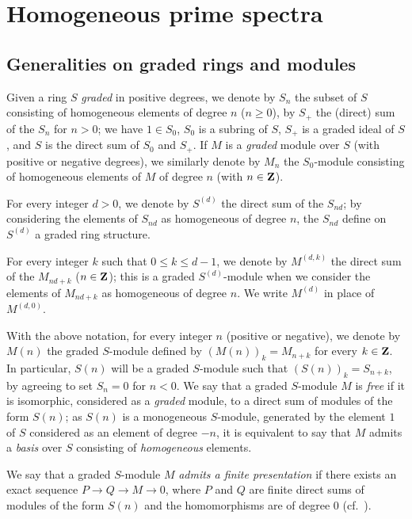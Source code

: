 \section{Homogeneous prime spectra}
\label{section:II.2}

\subsection{Generalities on graded rings and modules}
\label{subsection:II.2.1}

\begin{notation}[2.1.1]
\label{II.2.1.1}
Given a ring $S$ \emph{graded} in positive degrees, we denote by $S_n$ the subset of $S$ consisting of homogeneous elements of degree $n$ ($n\geq 0$), by $S_+$ the (direct) sum of the $S_n$ for $n>0$;
we have $1\in S_0$, $S_0$ is a subring of $S$, $S_+$ is a graded ideal of $S$, and $S$ is the direct sum of $S_0$ and $S_+$.
If $M$ is a \emph{graded} module over $S$ (with positive or negative degrees), we similarly denote by $M_n$ the $S_0$-module consisting of homogeneous elements of $M$ of degree $n$ (with $n\in\mathbf{Z}$).

For every integer $d>0$, we denote by $S^{(d)}$ the direct sum of the $S_{nd}$;
by considering the elements of $S_{nd}$ as homogeneous of degree $n$, the $S_{nd}$ define on $S^{(d)}$ a graded ring structure.

For every integer $k$ such that $0\leq k\leq d-1$, we denote by $M^{(d,k)}$ the direct sum
of the $M_{nd+k}$ ($n\in\mathbf{Z}$);
this is a graded $S^{(d)}$-module when we consider the elements of $M_{nd+k}$ as homogeneous of degree $n$.
We write $M^{(d)}$ in place of $M^{(d,0)}$.

With the above notation, for every integer $n$ (positive or negative), we denote by $M(n)$ the graded $S$-module defined by $(M(n))_k=M_{n+k}$ for every $k\in\mathbf{Z}$.
In particular, $S(n)$ will be a graded $S$-module such that $(S(n))_k=S_{n+k}$, by agreeing to set $S_n=0$ for $n<0$.
We say that a graded $S$-module $M$ is \emph{free} if it is isomorphic, considered as a \emph{graded} module, to a direct sum of modules of the form $S(n)$;
as $S(n)$ is a monogeneous $S$-module, generated by the element $1$ of $S$ considered as an element of degree $-n$, it is equivalent to say that $M$ admits a \emph{basis} over $S$ consisting of \emph{homogeneous} elements.

We say that a graded $S$-module $M$ \emph{admits a finite presentation} if there exists an exact sequence $P\to Q\to M\to 0$, where $P$ and $Q$ are finite direct sums of modules of the form $S(n)$ and the homomorphisms are of degree $0$ (cf.~).
\end{notation}

